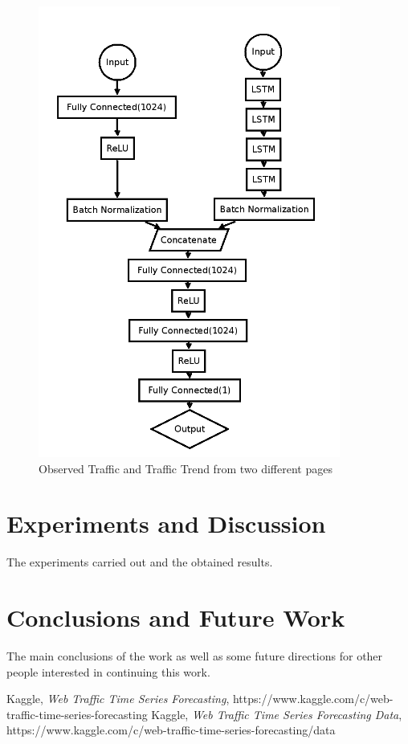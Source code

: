 \documentclass[conference]{IEEEtran}
\begin{document}
\begin{figure}[h!]
  \includegraphics[width=\linewidth]{lstm.png}
  \caption{Observed Traffic and Traffic Trend from two different pages}
  \label{fig:analysis1}
\end{figure}

\section{Experiments and Discussion}

The experiments carried out and the obtained
results.

\section{Conclusions and Future Work}

The main conclusions of the work as well as some future directions for other people interested in continuing this work. 

\begin{thebibliography}{00}
  Kaggle,
  \textit{Web Traffic Time Series Forecasting},
  https://www.kaggle.com/c/web-traffic-time-series-forecasting
  Kaggle,
  \textit{Web Traffic Time Series Forecasting Data},
  https://www.kaggle.com/c/web-traffic-time-series-forecasting/data
\end{thebibliography}
\end{document}
